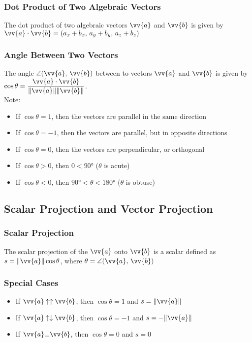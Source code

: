 \documentclass{article}
\newcommand{\mv}[1]{
	\lVert\vv{#1}\rVert
}
\begin{document}
	\subsubsection{Dot Product of Two Algebraic Vectors}
	The dot product of two algebraic vectors $\vv{a}$ and $\vv{b}$ is given by $\vv{a}\cdot\vv{b}=(a_x+b_x,\,a_y+b_y,\,a_z+b_z)$
	\subsubsection{Angle Between Two Vectors}
	The angle $\angle(\vv{a},\,\vv{b})$ between to vectors $\vv{a}$ and $\vv{b}$ is given by $\cos\theta=\dfrac{\vv{a}\cdot\vv{b}}{\mv{a}\mv{b}}$.\\Note:
	\begin{itemize}
		\item If $\cos\theta=1$, then the vectors are parallel in the same direction
		\item If $\cos\theta=-1$, then the vectors are parallel, but in opposite directions
		\item If $\cos\theta=0$, then the vectors are perpendicular, or orthogonal
		\item If $\cos\theta>0$, then $0<\ang{90}$ ($\theta$ is acute)
		\item If $\cos\theta<0$, then $\ang{90}<\theta<\ang{180}$ ($\theta$ is obtuse)
	\end{itemize}
	\subsection{Scalar Projection and Vector Projection}
	\subsubsection{Scalar Projection}
	The scalar projection of the $\vv{a}$ onto $\vv{b}$ is a scalar defined as $s=\mv{a}\cos\theta$, where $\theta=\angle(\vv{a},\,\vv{b})$
	\subsubsection{Special Cases}
	\begin{itemize}
		\item If $\vv{a}\uparrow\uparrow\vv{b}$, then $\cos\theta=1$ and $s=\mv{a}$
		\item If $\vv{a}\uparrow\downarrow\vv{b}$, then $\cos\theta=-1$ and $s=-\mv{a}$
		\item If $\vv{a}\bot\vv{b}$, then $\cos\theta=0$ and $s=0$
	\end{itemize}
\end{document}
